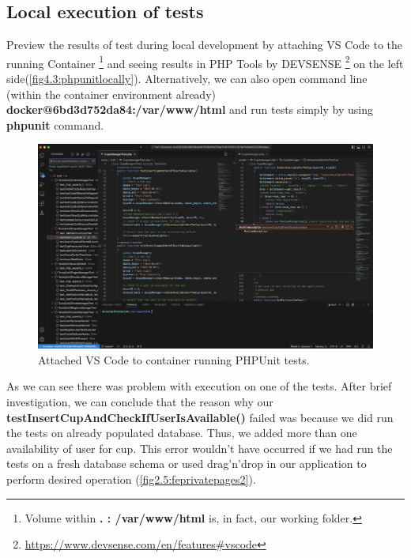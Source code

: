 \subsection{Local execution of tests}
Preview the results of test during local development by attaching VS Code to the running Container \footnote{Volume within \textbf{. : /var/www/html} is, in fact, our working folder.} and seeing results in PHP Tools by DEVSENSE \footnote{\url{https://www.devsense.com/en/features\#vscode}} on the left side(\autoref{fig4.3:phpunitlocally}). Alternatively, we can also open command line (within the container environment already) \textbf{docker@6bd3d752da84:/var/www/html} and run tests simply by using \textbf{phpunit} command. 
\begin{figure}[h]	
    \centering	
    \includegraphics[scale=0.242]{img/phpunit_locally.png}
    \caption{Attached VS Code to container running PHPUnit tests.}
    \label{fig4.3:phpunitlocally}
\end{figure}
\newline
As we can see there was problem with execution on one of the tests. After brief investigation, we can conclude that the reason why our \textbf{testInsertCupAndCheckIfUserIsAvailable()} failed was because we did run the tests on already populated database. Thus, we added more than one availability of user for cup. This error wouldn't have occurred if we had run the tests on a fresh database schema or used drag'n'drop in our application to perform desired operation (\autoref{fig2.5:feprivatepages2}).  
\newpage
